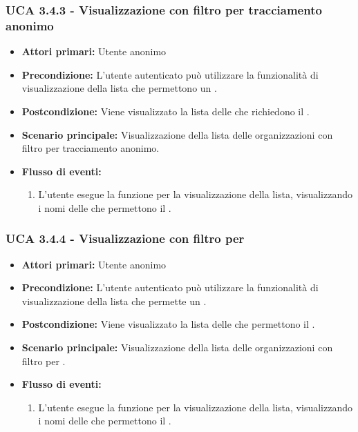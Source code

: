 \subsubsection{UCA 3.4.3 - Visualizzazione con filtro per tracciamento anonimo}%
\begin{itemize}
	\item \textbf{Attori primari:} Utente anonimo
	\item \textbf{Precondizione:} L'utente autenticato può utilizzare la funzionalità di visualizzazione della lista che permettono un .
	\item \textbf{Postcondizione:} Viene visualizzato la lista delle  che richiedono il .
	\item \textbf{Scenario principale:} Visualizzazione della lista delle organizzazioni con filtro per tracciamento anonimo.
	\item \textbf{Flusso di eventi:}
		\begin{enumerate}
		\item L'utente esegue la funzione per la visualizzazione della lista, visualizzando i nomi delle  che permettono il .
	\end{enumerate}
\end{itemize}

\subsubsection{UCA 3.4.4 - Visualizzazione con filtro per }%
\begin{itemize}
	\item \textbf{Attori primari:} Utente anonimo
	\item \textbf{Precondizione:} L'utente autenticato può utilizzare la funzionalità di visualizzazione della lista che permette un .
	\item \textbf{Postcondizione:} Viene visualizzato la lista delle  che permettono il .
	\item \textbf{Scenario principale:} Visualizzazione della lista delle organizzazioni con filtro per .
	\item \textbf{Flusso di eventi:}
	\begin{enumerate}
		\item L'utente esegue la funzione per la visualizzazione della lista, visualizzando i nomi delle  che permettono il .
	\end{enumerate}
\end{itemize}

